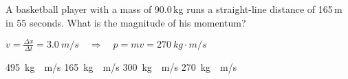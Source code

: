 \documentclass[]{exam}
\begin{document}
\begin{questions}





\question %
A basketball player with a mass of 90.0\,kg runs a straight-line distance of 165\,m in 55 seconds.  What is the magnitude of his momentum?

\ifprintanswers
{\color{red}  $v = \frac{\Delta x}{\Delta t} = \SI{3.0}{m/s} \quad \Rightarrow \quad p = m v = \SI{270}{kg\cdot m/s}$ }
\fi

\begin{randomizechoices}
    \choice \SI{495}{kg\cdot m/s}
    \choice \SI{165}{kg\cdot m/s}
    \choice \SI{300}{kg\cdot m/s}
    \correctchoice \SI{270}{kg\cdot m/s}
\end{randomizechoices}











\end{questions}
\end{document}
